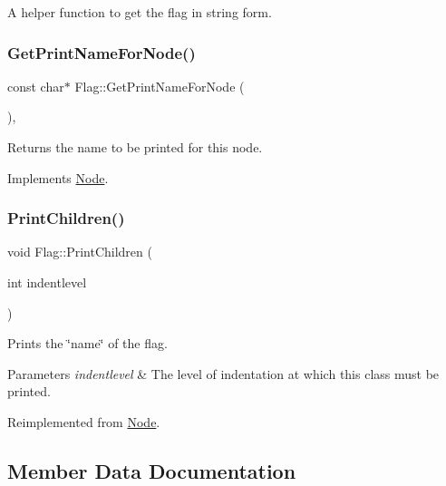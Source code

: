 A helper function to get the flag in string form. \mbox{\label{class_flag_a8d133ca3fbbef512357b5c80b0fe1222}} 
\subsubsection{\texorpdfstring{Get\+Print\+Name\+For\+Node()}{GetPrintNameForNode()}}
{\footnotesize\ttfamily const char$\ast$ Flag\+::\+Get\+Print\+Name\+For\+Node (\begin{DoxyParamCaption}{ }\end{DoxyParamCaption})\hspace{0.3cm}{\ttfamily [inline]}, {\ttfamily [virtual]}}

Returns the name to be printed for this node. 

Implements \hyperlink{class_node_a56e29657306ffb004d69c6929ae44269}{Node}.

\mbox{\label{class_flag_a05ac578c888a303d979d1d7b006ad7ba}} 
\subsubsection{\texorpdfstring{Print\+Children()}{PrintChildren()}}
{\footnotesize\ttfamily void Flag\+::\+Print\+Children (\begin{DoxyParamCaption}\item[{int}]{indentlevel }\end{DoxyParamCaption})\hspace{0.3cm}{\ttfamily [virtual]}}

Prints the \char`\"{}name\char`\"{} of the flag. 
\begin{DoxyParams}{Parameters}
{\em indentlevel} & The level of indentation at which this class must be printed. \\
\hline
\end{DoxyParams}


Reimplemented from \hyperlink{class_node_a3e67ec8d22182b721717af14fe0c3000}{Node}.



\subsection{Member Data Documentation}
\mbox{\label{class_flag_a78bfa49c8908ef53f7d5b50be62ecbc9}} 
